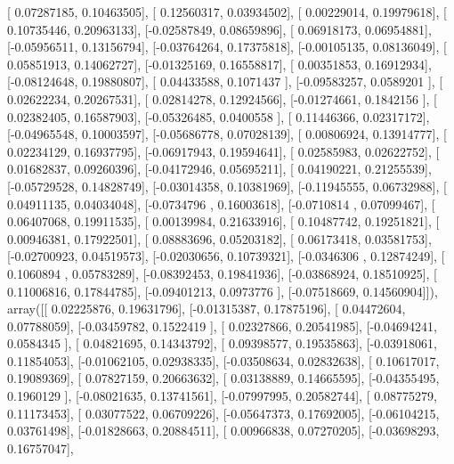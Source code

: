 \documentclass{article}
\begin{document}
       [ 0.07287185,  0.10463505],
       [ 0.12560317,  0.03934502],
       [ 0.00229014,  0.19979618],
       [ 0.10735446,  0.20963133],
       [-0.02587849,  0.08659896],
       [ 0.06918173,  0.06954881],
       [-0.05956511,  0.13156794],
       [-0.03764264,  0.17375818],
       [-0.00105135,  0.08136049],
       [ 0.05851913,  0.14062727],
       [-0.01325169,  0.16558817],
       [ 0.00351853,  0.16912934],
       [-0.08124648,  0.19880807],
       [ 0.04433588,  0.1071437 ],
       [-0.09583257,  0.0589201 ],
       [ 0.02622234,  0.20267531],
       [ 0.02814278,  0.12924566],
       [-0.01274661,  0.1842156 ],
       [ 0.02382405,  0.16587903],
       [-0.05326485,  0.0400558 ],
       [ 0.11446366,  0.02317172],
       [-0.04965548,  0.10003597],
       [-0.05686778,  0.07028139],
       [ 0.00806924,  0.13914777],
       [ 0.02234129,  0.16937795],
       [-0.06917943,  0.19594641],
       [ 0.02585983,  0.02622752],
       [ 0.01682837,  0.09260396],
       [-0.04172946,  0.05695211],
       [ 0.04190221,  0.21255539],
       [-0.05729528,  0.14828749],
       [-0.03014358,  0.10381969],
       [-0.11945555,  0.06732988],
       [ 0.04911135,  0.04034048],
       [-0.0734796 ,  0.16003618],
       [-0.0710814 ,  0.07099467],
       [ 0.06407068,  0.19911535],
       [ 0.00139984,  0.21633916],
       [ 0.10487742,  0.19251821],
       [ 0.00946381,  0.17922501],
       [ 0.08883696,  0.05203182],
       [ 0.06173418,  0.03581753],
       [-0.02700923,  0.04519573],
       [-0.02030656,  0.10739321],
       [-0.0346306 ,  0.12874249],
       [ 0.1060894 ,  0.05783289],
       [-0.08392453,  0.19841936],
       [-0.03868924,  0.18510925],
       [ 0.11006816,  0.17844785],
       [-0.09401213,  0.0973776 ],
       [-0.07518669,  0.14560904]]), array([[ 0.02225876,  0.19631796],
       [-0.01315387,  0.17875196],
       [ 0.04472604,  0.07788059],
       [-0.03459782,  0.1522419 ],
       [ 0.02327866,  0.20541985],
       [-0.04694241,  0.0584345 ],
       [ 0.04821695,  0.14343792],
       [ 0.09398577,  0.19535863],
       [-0.03918061,  0.11854053],
       [-0.01062105,  0.02938335],
       [-0.03508634,  0.02832638],
       [ 0.10617017,  0.19089369],
       [ 0.07827159,  0.20663632],
       [ 0.03138889,  0.14665595],
       [-0.04355495,  0.1960129 ],
       [-0.08021635,  0.13741561],
       [-0.07997995,  0.20582744],
       [ 0.08775279,  0.11173453],
       [ 0.03077522,  0.06709226],
       [-0.05647373,  0.17692005],
       [-0.06104215,  0.03761498],
       [-0.01828663,  0.20884511],
       [ 0.00966838,  0.07270205],
       [-0.03698293,  0.16757047],
\end{document}
